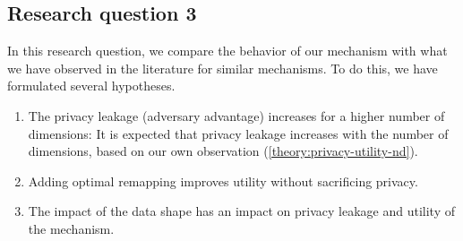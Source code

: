 
%

\subsection{Research question 3}
In this research question, we compare the behavior of our mechanism with what we have observed in the literature for similar mechanisms.
To do this, we have formulated several hypotheses.
\begin{enumerate}
  \item The privacy leakage (adversary advantage) increases for a higher number of dimensions:
        It is expected that privacy leakage increases with the number of dimensions, based on our own observation (\ref{theory:privacy-utility-nd}).
  \item Adding optimal remapping improves utility without sacrificing privacy.
  \item The impact of the data shape has an impact on privacy leakage and utility of the mechanism.
\end{enumerate}
